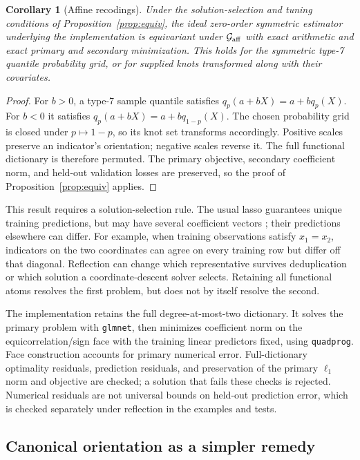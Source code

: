 \documentclass[11pt]{article}
\newtheorem{corollary}{Corollary}
\theoremstyle{definition}
\theoremstyle{remark}
\begin{document}
\begin{corollary}[Affine recodings]\label{cor:affine}
Under the solution-selection and tuning conditions of
Proposition~\ref{prop:equiv}, the ideal zero-order symmetric estimator
underlying the implementation is equivariant under $\mathcal G_{\rm aff}$
with exact arithmetic and exact primary and secondary minimization. This holds
for the symmetric type-7 quantile probability grid, or for supplied knots
transformed along with their covariates.
\end{corollary}
\begin{proof}
For $b>0$, a type-7 sample quantile satisfies
$q_p(a+bX)=a+bq_p(X)$. For $b<0$ it satisfies
$q_p(a+bX)=a+bq_{1-p}(X)$. The chosen probability grid is closed under
$p\mapsto1-p$, so its knot set transforms accordingly. Positive scales
preserve an indicator's orientation; negative scales reverse it. The full
functional dictionary is therefore permuted. The primary objective,
secondary coefficient norm, and held-out validation losses are preserved,
so the proof of Proposition~\ref{prop:equiv} applies.
\end{proof}

This result requires a solution-selection rule. The usual lasso guarantees
unique training predictions, but may have several coefficient vectors
\citep{tibshirani2013}; their predictions elsewhere can differ. For example,
when training observations satisfy $x_1=x_2$, indicators on the two
coordinates can agree on every training row but differ off that diagonal.
Reflection can change which representative survives deduplication or which
solution a coordinate-descent solver selects. Retaining all functional
atoms resolves the first problem, but does not by itself resolve the second.

The implementation retains the full degree-at-most-two dictionary. It solves
the primary problem with \texttt{glmnet}, then minimizes coefficient norm
on the equicorrelation/sign face with the training linear predictors fixed,
using \texttt{quadprog}. Face construction accounts for primary numerical
error. Full-dictionary optimality residuals, prediction residuals, and
preservation of the primary $\ell_1$ norm and objective are checked; a
solution that fails these checks is rejected. Numerical residuals are not
universal bounds on held-out prediction error, which is checked separately
under reflection in the examples and tests.

\subsection{Canonical orientation as a simpler remedy}\label{sec:canonical}
\end{document}

